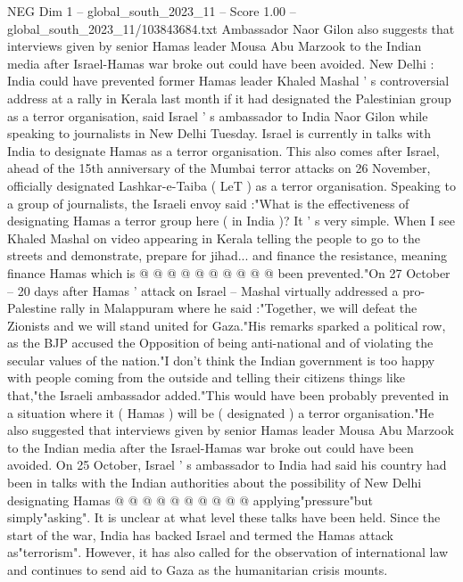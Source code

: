 \begin{textsample}{NEG Dim 1 – global\_south\_2023\_11 – Score 1.00 – global\_south\_2023\_11/103843684.txt}  \label{ex:f1_neg_229}
Ambassador Naor Gilon also suggests that interviews given by senior Hamas leader Mousa Abu Marzook to the Indian media after Israel-Hamas war broke out could have been avoided.
New Delhi : India could have prevented former Hamas leader Khaled Mashal ' s controversial address at a rally in Kerala last month if it had designated the Palestinian group as a terror organisation, said Israel ' s ambassador to India Naor Gilon while speaking to journalists in New Delhi Tuesday.
Israel is currently in talks with India to designate Hamas as a terror organisation.
This also comes after Israel, ahead of the 15th anniversary of the Mumbai terror attacks on 26 November, officially designated Lashkar-e-Taiba ( LeT ) as a terror organisation.
Speaking to a group of journalists, the Israeli envoy said :"What is the effectiveness of designating Hamas a terror group here ( in India )?
It ' s very simple.
When I see Khaled Mashal on video appearing in Kerala telling the people to go to the streets and demonstrate, prepare for jihad... and finance the resistance, meaning finance Hamas which is @ @ @ @ @ @ @ @ @ @ been prevented."On 27 October -- 20 days after Hamas ' attack on Israel -- Mashal virtually addressed a pro-Palestine rally in Malappuram where he said :"Together, we will defeat the Zionists and we will stand united for Gaza."His remarks sparked a political row, as the BJP accused the Opposition of being anti-national and of violating the secular values of the nation."I don't think the Indian government is too happy with people coming from the outside and telling their citizens things like that,"the Israeli ambassador added."This would have been probably prevented in a situation where it ( Hamas ) will be ( designated ) a terror organisation."He also suggested that interviews given by senior Hamas leader Mousa Abu Marzook to the Indian media after the Israel-Hamas war broke out could have been avoided.
On 25 October, Israel ' s ambassador to India had said his country had been in talks with the Indian authorities about the possibility of New Delhi designating Hamas @ @ @ @ @ @ @ @ @ @ applying"pressure"but simply"asking".
It is unclear at what level these talks have been held.
Since the start of the war, India has backed Israel and termed the Hamas attack as"terrorism".
However, it has also called for the observation of international law and continues to send aid to Gaza as the humanitarian crisis mounts.

\end{textsample}
